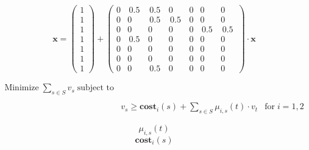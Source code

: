\documentclass{article}
\begin{document}
\[
\mathbf{x} =
\left(
\begin{array}{c}
1  \\
1  \\
1   \\
1  \\
1  \\
1  \\
1  
\end{array}
\right)
+
\left(
\begin{array}{ccccccccccccc}
0 & \, 0.5 \, & \, 0.5 \, & 0 & 0 & 0& 0  \\
0 & 0 & \, 0.5 \, & \, 0.5 \, & 0 & 0 & 0 \\
0 & 0 & 0 & 0 & 0 & \, 0.5 \, & \, 0.5 \, \\
0 & \, 0.5 \, & 0 & 0 & 0 & 0 & 0 \\
0 & 0 & 0 & 0 & 0 & 0 & 0\\
0 & 0 & 0 & 0 & 0 & 0 & 0\\
0 & 0 & \, 0.5 \, & 0 & 0 & 0 & 0 
\end{array}
\right)
\cdot
\mathbf{x}
\]

\begin{eqnarray*}
\mbox{Minimize} \; \sum_{s \in S} v_s \; \mbox{subject to} && \\ \\
&
\!\!\!\!\!\!\!\!\!\!\!\!\!\!\!\!\!\!\!\!\!\!\!\!\!\!\!\!\!\!\!\!\!\!\!\!\!\!\!\!\!\!\!\!\!\!\!\!\!\!\!\!\!\!\!\!\!\!\!\! 
v_s \geq \mathbf{cost}_i(s) + \displaystyle\sum\limits_{s \in S} \mu_{i,s}(t) \cdot v_t & \mbox{for} \; i=1,2
\end{eqnarray*}

\[
\mu_{i,s}(t)
\]
\[
 \mathbf{cost}_i(s)
\]
\end{document}
